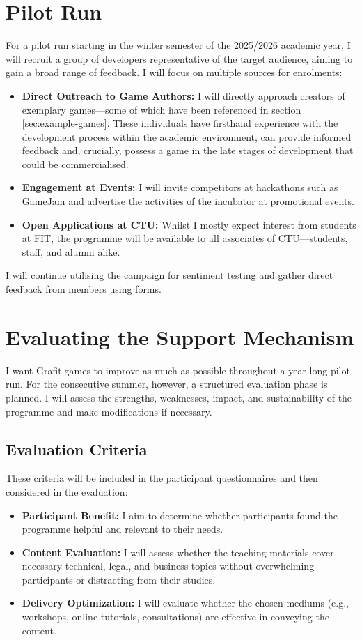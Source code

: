 \section{Pilot Run}
For a pilot run starting in the winter semester of the 2025/2026 academic year, I will recruit a group of developers representative of the target audience, aiming to gain a broad range of feedback. I will focus on multiple sources for enrolments:
\begin{itemize}
    \item \textbf{Direct Outreach to Game Authors:} I will directly approach creators of exemplary games---some of which have been referenced in section \ref{sec:example-games}. These individuals have firsthand experience with the development process within the academic environment, can provide informed feedback and, crucially, possess a game in the late stages of development that could be commercialised.
    \item \textbf{Engagement at Events:} I will invite competitors at hackathons such as GameJam and advertise the activities of the incubator at promotional events.
    \item \textbf{Open Applications at CTU:} Whilst I mostly expect interest from students at FIT, the programme will be available to all associates of CTU---students, staff, and alumni alike.
\end{itemize}
I will continue utilising the campaign for sentiment testing and gather direct feedback from members using forms.

\section{Evaluating the Support Mechanism}
I want Grafit.games to improve as much as possible throughout a year-long pilot run. For the consecutive summer, however, a structured evaluation phase is planned. I will assess the strengths, weaknesses, impact, and sustainability of the programme and make modifications if necessary.

\subsection{Evaluation Criteria}
These criteria will be included in the participant questionnaires and then considered in the evaluation:\begin{itemize}
    \item \textbf{Participant Benefit:} I aim to determine whether participants found the programme helpful and relevant to their needs.
    \item \textbf{Content Evaluation:} I will assess whether the teaching materials cover necessary technical, legal, and business topics without overwhelming participants or distracting from their studies.
    \item \textbf{Delivery Optimization:} I will evaluate whether the chosen mediums (e.g., workshops, online tutorials, consultations) are effective in conveying the content.
\end{itemize}

